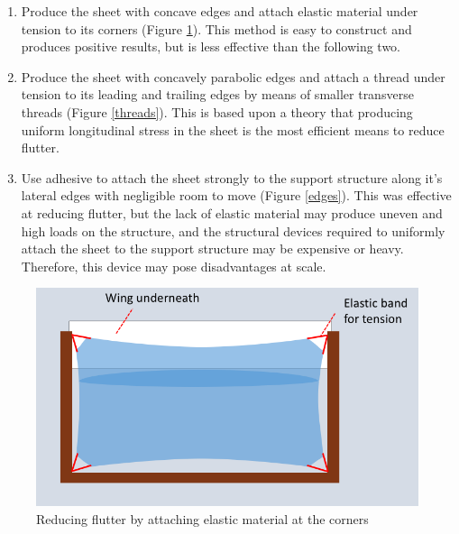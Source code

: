\documentclass[12pt]{report} %
\begin{document}
\begin{enumerate}

\item Produce the sheet with concave edges and attach elastic material under tension to its corners (Figure \ref{corners}).
This method is easy to construct and produces positive results, but is less effective than the following two.

\item Produce the sheet with concavely parabolic edges and attach a thread under tension to its leading and trailing
edges by means of smaller transverse threads (Figure \ref{threads}). This is based upon a theory that producing uniform
longitudinal stress in the sheet is the most efficient means to reduce flutter.

\item Use adhesive to attach the sheet strongly to the support structure along it's lateral edges with negligible room
to move (Figure \ref{edges}). This was effective at reducing flutter, but the lack of elastic material may produce uneven
and high loads on the structure, and the structural devices required to uniformly attach the sheet to the support structure
may be expensive or heavy. Therefore, this device may pose disadvantages at scale.

\end{enumerate}

\begin{figure}
\includegraphics[width = \linewidth]{corners.png}
\caption{Reducing flutter by attaching elastic material at the corners}
\label{corners}
\end{figure}
\end{document}
